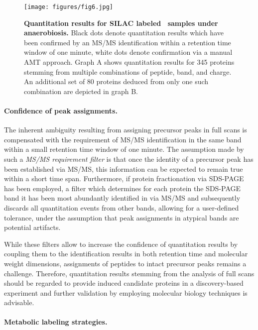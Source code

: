 \begin{figure}
\texttt{[image: figures/fig6.jpg]}
\caption{
{\bf Quantitation results for SILAC labeled \cre~samples under anaerobiosis.} 
Black dots denote quantitation results which have been confirmed by an
MS/MS identification within a retention time window of one minute, white dots
denote confirmation via a manual AMT approach.
Graph A shows quantitation results for 345 proteins stemming from multiple 
combinations of peptide, band, and charge. An additional set of 80 proteins 
deduced from only one such combination are depicted in graph B.
}
\label{fig:qtrace-mia}
\end{figure}

\paragraph{Confidence of peak assignments.}

The inherent ambiguity resulting from assigning precursor peaks in full scans
is compensated with the requirement of MS/MS identification in the same band
within a small retention time window of one minute.
The assumption made by such a {\em MS/MS requirement filter} is that once the
identity of a precursor peak has been established via MS/MS, this information
can be expected to remain true within a short time span.
Furthermore, if protein fractionation via SDS-PAGE has been employed, a filter
which determines for each protein the SDS-PAGE band it has been most abundantly
identified in via MS/MS and subsequently discards all quantitation events
from other bands, allowing for a user-defined tolerance, under the assumption
that peak assignments in atypical bands are potential artifacts.

While these filters allow to increase the confidence of quantitation results
by coupling them to the identification results in both retention time and
molecular weight dimensions, assignments of peptides to intact precursor
peaks remains a challenge.
Therefore, quantitation results stemming from the analysis of full scans
should be regarded to provide induced candidate proteins in a discovery-based
experiment and further validation by employing molecular biology techniques
is advisable.

\paragraph{Metabolic labeling strategies.}

